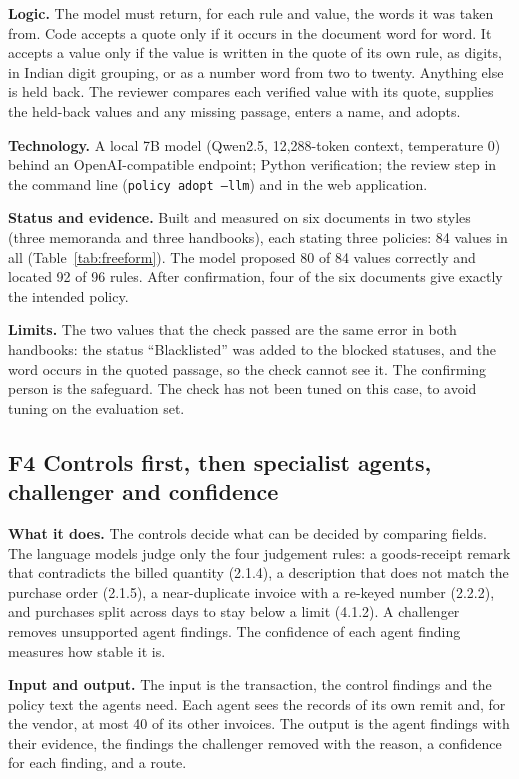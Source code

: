 \documentclass[11pt,a4paper]{article}
\begin{document}
\textbf{Logic.} The model must return, for each rule and value, the words it was taken from. Code accepts a quote only if it occurs in the document word for word. It accepts a value only if the value is written in the quote of its own rule, as digits, in Indian digit grouping, or as a number word from two to twenty. Anything else is held back. The reviewer compares each verified value with its quote, supplies the held-back values and any missing passage, enters a name, and adopts.

\textbf{Technology.} A local 7B model (Qwen2.5, 12,288-token context, temperature 0) behind an OpenAI-compatible endpoint; Python verification; the review step in the command line (\texttt{policy adopt --llm}) and in the web application.

\textbf{Status and evidence.} Built and measured on six documents in two styles (three memoranda and three handbooks), each stating three policies: 84 values in all (Table~\ref{tab:freeform}). The model proposed 80 of 84 values correctly and located 92 of 96 rules. After confirmation, four of the six documents give exactly the intended policy.

\textbf{Limits.} The two values that the check passed are the same error in both handbooks: the status ``Blacklisted'' was added to the blocked statuses, and the word occurs in the quoted passage, so the check cannot see it. The confirming person is the safeguard. The check has not been tuned on this case, to avoid tuning on the evaluation set.

\subsection{F4 Controls first, then specialist agents, challenger and confidence}
\textbf{What it does.} The controls decide what can be decided by comparing fields. The language models judge only the four judgement rules: a goods-receipt remark that contradicts the billed quantity (2.1.4), a description that does not match the purchase order (2.1.5), a near-duplicate invoice with a re-keyed number (2.2.2), and purchases split across days to stay below a limit (4.1.2). A challenger removes unsupported agent findings. The confidence of each agent finding measures how stable it is.

\textbf{Input and output.} The input is the transaction, the control findings and the policy text the agents need. Each agent sees the records of its own remit and, for the vendor, at most 40 of its other invoices. The output is the agent findings with their evidence, the findings the challenger removed with the reason, a confidence for each finding, and a route.
\end{document}
